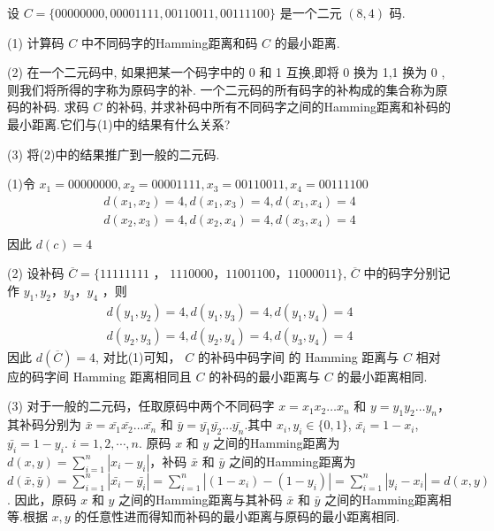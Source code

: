 \newpage
  \begin{tcolorbox}[breakable,colback=blue!5!white,colframe=blue!75!black,
 title= 解答题]

设 $ C=\{00000000,00001111,00110011,00111100\} $ 是一个二元 $ (8,4) $ 码.

(1) 计算码 $ C $ 中不同码字的Hamming距离和码 $ C $ 的最小距离.

(2) 在一个二元码中, 如果把某一个码字中的 0 和 1 互换,即将 0 换为 1,1 换为 0 , 则我们将所得的字称为原码字的补. 一个二元码的所有码字的补构成的集合称为原码的补码. 求码 $ C $ 的补码, 并求补码中所有不同码字之间的Hamming距离和补码的最小距离.它们与(1)中的结果有什么关系?

(3) 将(2)中的结果推广到一般的二元码.
 \tcblower

(1)令 $x_{1}=00000000, x_{2}=00001111, x_{3}=00110011, x_{4}=00111100$ 
$$
\begin{array}{l}
d\left(x_{1}, x_{2}\right)=4, d\left(x_{1}, x_{3}\right)=4, d\left(x_{1}, x_{4}\right)=4 \\
d\left(x_{2}, x_{3}\right)=4, d\left(x_{2}, x_{4}\right)=4, d\left(x_{3}, x_{4}\right)=4 \\
\end{array}
$$
因此 $ d(c)=4 $

(2) 设补码 $ \overline{C}=\{11111111 $ ， $ 1110000 ， 11001100 ， 11000011\} $,
$\overline{C}$ 中的码字分别记作 $ y_{1}, y_{2} ， y_{3} ， y_{4} $ ，则
$$
\begin{array}{l}
d\left(y_{1}, y_{2}\right)=4, d\left(y_{1}, y_{3}\right)=4, d\left(y_{1}, y_{4}\right)=4 \\
d\left(y_{2}, y_{3}\right)=4, d\left(y_{2}, y_{4}\right)=4, d\left(y_{3}, y_{4}\right)=4
\end{array}
$$
因此 $ d\left(\overline{C}\right)=4 $, 对比(1)可知， $C$ 的补码中码字间
的 Hamming 距离与 $ C $ 相对应的码字间 Hamming
距离相同且 $C$ 的补码的最小距离与 $C$ 的最小距离相同.

(3) 对于一般的二元码，任取原码中两个不同码字 $ x = x_1 x_2 \ldots x_n $ 和 $ y = y_1 y_2 \ldots y_n $，其补码分别为 $ \bar{x} = \bar{x_1} \bar{x_2} \ldots \bar{x_n} $ 和 $ \bar{y} = \bar{y_1} \bar{y_2} \ldots \bar{y_n} $.其中 $ x_i,y_i \in \{0, 1\} $, $ \bar{x_i} = 1 - x_i $, $ \bar{y_i} = 1 - y_i $. $i=1,2,\cdots,n$.
原码 $ x $ 和 $ y $ 之间的Hamming距离为 $ d(x, y) = \sum\limits_{i=1}^{n} |x_i - y_i| $，补码 $ \bar{x} $ 和 $ \bar{y} $ 之间的Hamming距离为 $ d(\bar{x}, \bar{y}) = \sum\limits_{i=1}^{n} |\bar{x_i} - \bar{y_i}| = \sum\limits_{i=1}^{n} |(1 - x_i) - (1 - y_i)| = \sum\limits_{i=1}^{n} |y_i - x_i| = d(x, y) $.
因此，原码 $ x $ 和 $ y $ 之间的Hamming距离与其补码 $ \bar{x} $ 和 $ \bar{y} $ 之间的Hamming距离相等.根据 $x,y$ 的任意性进而得知而补码的最小距离与原码的最小距离相同.
 \end{tcolorbox}